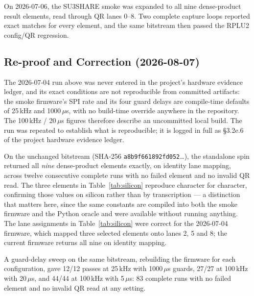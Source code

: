 \documentclass[conference]{IEEEtran}
\begin{document}
On 2026-07-06, the SU3SHARE smoke was expanded to all nine dense-product
result elements, read through QR lanes 0--8. Two complete capture loops
reported exact matches for every element, and the same bitstream then
passed the RPLU2 config/QR regression.

\subsection{Re-proof and Correction (2026-08-07)}
\label{sec:reproof}

The 2026-07-04 run above was never entered in the project's hardware
evidence ledger, and its exact conditions are not reproducible from
committed artifacts: the smoke firmware's SPI rate and its four guard
delays are compile-time defaults of 25\,kHz and 1000\,$\mu$s, with no
build-time override anywhere in the repository. The 100\,kHz /
20\,$\mu$s figures therefore describe an uncommitted local build. The run
was repeated to establish what is reproducible; it is logged in full as
\S3.2e.6 of the project hardware evidence ledger.

On the unchanged bitstream (SHA-256 \texttt{a8b9f661892fd052}\ldots), the
standalone spin returned all \emph{nine} dense-product elements exactly, on
identity lane mapping, across twelve consecutive complete runs with no failed
element and no invalid QR read. The three elements in
Table~\ref{tab:silicon} reproduce character for character, confirming those
values on silicon rather than by transcription --- a distinction that matters
here, since the same constants are compiled into both the smoke firmware and
the Python oracle and were available without running anything. The lane
assignments in Table~\ref{tab:silicon} were correct for the 2026-07-04
firmware, which mapped three selected elements onto lanes 2, 5 and 8; the
current firmware returns all nine on identity mapping.

A guard-delay sweep on the same bitstream, rebuilding the firmware for each
configuration, gave 12/12 passes at 25\,kHz with 1000\,$\mu$s guards, 27/27 at
100\,kHz with 20\,$\mu$s, and 44/44 at 100\,kHz with 5\,$\mu$s: 83 complete
runs with no failed element and no invalid QR read at any setting.
\end{document}
